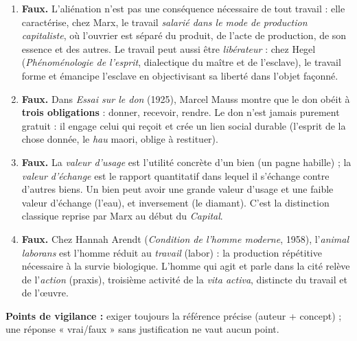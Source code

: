 \documentclass[11pt]{article}
\begin{document}
\begin{corrige}
\begin{enumerate}
    \item \textbf{Faux.} L'aliénation n'est pas une conséquence nécessaire de tout travail : elle caractérise, chez Marx, le travail \emph{salarié dans le mode de production capitaliste}, où l'ouvrier est séparé du produit, de l'acte de production, de son essence et des autres. Le travail peut aussi être \emph{libérateur} : chez Hegel (\emph{Phénoménologie de l'esprit}, dialectique du maître et de l'esclave), le travail forme et émancipe l'esclave en objectivisant sa liberté dans l'objet façonné.
    \item \textbf{Faux.} Dans \emph{Essai sur le don} (1925), Marcel Mauss montre que le don obéit à \textbf{trois obligations} : donner, recevoir, rendre. Le don n'est jamais purement gratuit : il engage celui qui reçoit et crée un lien social durable (l'esprit de la chose donnée, le \emph{hau} maori, oblige à restituer).
    \item \textbf{Faux.} La \emph{valeur d'usage} est l'utilité concrète d'un bien (un pagne habille) ; la \emph{valeur d'échange} est le rapport quantitatif dans lequel il s'échange contre d'autres biens. Un bien peut avoir une grande valeur d'usage et une faible valeur d'échange (l'eau), et inversement (le diamant). C'est la distinction classique reprise par Marx au début du \emph{Capital}.
    \item \textbf{Faux.} Chez Hannah Arendt (\emph{Condition de l'homme moderne}, 1958), l'\emph{animal laborans} est l'homme réduit au \emph{travail} (labor) : la production répétitive nécessaire à la survie biologique. L'homme qui agit et parle dans la cité relève de l'\emph{action} (praxis), troisième activité de la \emph{vita activa}, distincte du travail et de l'œuvre.
\end{enumerate}
\textbf{Points de vigilance :} exiger toujours la référence précise (auteur + concept) ; une réponse « vrai/faux » sans justification ne vaut aucun point.
\end{corrige}
\end{document}
